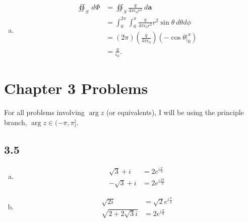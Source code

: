 \documentclass[12pt]{mypackage}
\begin{document}
\begin{enumerate}[(a)]
\begin{center}
      \end{center}
    \item 
      \begin{align*}
        \oiint_{S}^{} \:d\Phi &= \oiint_{S}^{} \frac{q}{4\pi \epsilon_0 r^2}\:d\mathbf{a}\\
                              &= \int_{0}^{2\pi}\int_{0}^{\pi}\frac{q}{4\pi \epsilon_0 r^2}r^2\sin\theta\:d\theta d\phi\\
                              &= \left(2\pi\right)\left(\frac{q}{4\pi \epsilon_0}\right)\left(-\cos\theta\bigr\vert_{0}^{\pi}\right)\\
                              &= \frac{q}{\epsilon_0}.
      \end{align*}
\end{enumerate}
\section{Chapter 3 Problems}%
For all problems involving $\arg z$ (or equivalents), I will be using the principle branch, $\arg z \in (-\pi,\pi]$.
\subsection{3.5}%
\begin{enumerate}[(a)]
  \item
    \begin{align*}
      \sqrt{3} + i &= 2e^{i\frac{\pi}{3}}\\
      -\sqrt{3} + i &= 2e^{i\frac{2\pi}{3}}
    \end{align*}
  \item 
    \begin{align*}
      \sqrt{2i} &= \sqrt{2}e^{i \frac{\pi}{4}}\\
      \sqrt{2 + 2\sqrt{3}i} &= 2e^{i \frac{\pi}{6}}
    \end{align*}
\end{enumerate}
\end{document}
